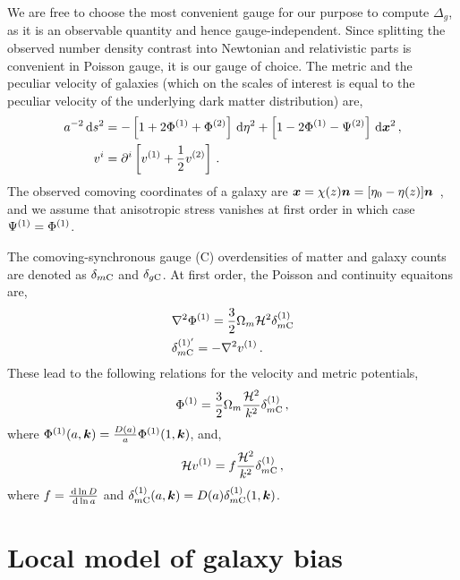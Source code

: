 We are free to choose the most convenient gauge for our purpose to compute $\Delta_g$, as it is an observable quantity and hence gauge-independent. Since splitting the observed number density contrast into Newtonian and relativistic parts is convenient in Poisson gauge, it is our gauge of choice. The metric and the peculiar velocity of galaxies (which on the scales of interest is equal to the peculiar velocity of the underlying dark matter distribution) are, 
\begin{align}
	a^{-2} \,\mathrm{d} s^2 &= - \left[ 1 + 2 \Phi^{(1)} + \Phi^{(2)} \right] \,\mathrm{d} \eta^2 + \left[ 1 - 2 \Phi^{(1)} - \Psi^{(2)} \right] \,\mathrm{d}\bm {x}^2\,,\\
	v^i &= \partial^i \left[ v^{(1)} + \frac{1}{2} v^{(2)} \right]\,.
\end{align}
The observed comoving coordinates of a galaxy are $\bm {x} = \chi(z) \bm {n} = [\eta_0 - \eta(z)] \bm {n}$~\cite{Bertacca:2014dra}, and we assume that anisotropic stress vanishes at first order in which case $\Psi^{(1)} = \Phi^{(1)}$.

The comoving-synchronous gauge (C) overdensities of matter and galaxy counts are denoted as $\delta_{m\mathrm{C}}$ and $\delta_{g\mathrm{C}}$. At first order, the Poisson and continuity equaitons are,
\begin{align}
	&\nabla^2 \Phi^{(1)} = \frac{3}{2} \Omega_m \mathcal{H}^2 \delta_{m\mathrm{C}}^{(1)} \\
	&\delta_{m\mathrm{C}}^{{(1)}'} = - \nabla^2 v^{(1)}\,.
\end{align}
These lead to the following relations for the velocity and metric potentials,
\begin{equation}
	\Phi^{(1)} = \frac{3}{2} \Omega_m \frac{\mathcal{H}^2}{k^2} \delta_{m\mathrm{C}}^{(1)}\,,
\end{equation}
where $\Phi^{(1)}(a,\bm {k}) = \frac{D(a)}{a} \Phi^{(1)}(1,\bm {k})$, and,
\begin{equation}\label{eq:scdepvel}
	\mathcal{H} v^{(1)} = f \frac{\mathcal{H}^2}{k^2} \delta^{(1)}_{m\mathrm{C}}\,,
\end{equation}
where $f = \frac{\,\mathrm{d} \ln D}{\,\mathrm{d} \ln a}$ and $\delta^{(1)}_{m\mathrm{C}}(a,\bm {k}) = D(a) \delta^{(1)}_{m\mathrm{C}}(1,\bm {k})$. 

\section{Local model of galaxy bias}

